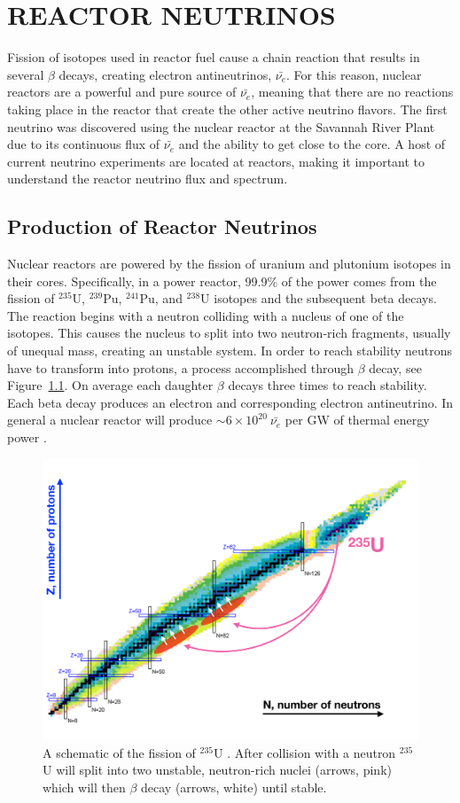 \chapter{\uppercase{Reactor Neutrinos}}

Fission of isotopes used in reactor fuel cause a chain reaction that results in several  $\beta$ decays, creating electron antineutrinos, $\bar{\nu_{e}}$.
For this reason, nuclear reactors are a powerful and pure source of $\bar{\nu_{e}}$, meaning that there are no reactions taking place in the reactor that create the other active neutrino flavors.
The first neutrino was discovered using the nuclear reactor at the Savannah River Plant due to its continuous flux of $\bar{\nu_{e}}$ and the ability to get close to the core.
A host of current neutrino experiments are located at reactors, making it important to understand the reactor neutrino flux and spectrum. 

\section{Production of Reactor Neutrinos}

Nuclear reactors are powered by the fission of uranium and plutonium isotopes in their cores. 
Specifically, in a power reactor, 99.9\% of the power comes from the fission of $^{235}$U, $^{239}$Pu, $^{241}$Pu, and $^{238}$U isotopes and the subsequent beta decays.
The reaction begins with a neutron colliding with a nucleus of one of the isotopes. 
This causes the nucleus to split into two neutron-rich fragments, usually of unequal mass, creating an unstable system.
In order to reach stability neutrons have to transform into protons, a process accomplished through $\beta$ decay, see Figure~\ref{fig:nucchart}.
On average each daughter $\beta$ decays three times to reach stability.
Each beta decay produces an electron and corresponding electron antineutrino. 
In general a nuclear reactor will produce $\sim 6 \times 10^{20}~\bar{\nu_e}$ per GW of thermal energy power \cite{HayesVogel}.

\begin{figure}[h]
	\centering
	\includegraphics[width=0.7\linewidth]{tex/3-reactorneutrinos-images/NuclideChart_U235}
	\caption{A schematic of the fission of $^{235}$U \cite{NucChart}. After collision with a neutron $^{235}$U will split into two unstable, neutron-rich nuclei (arrows, pink) which will then $\beta$ decay (arrows, white) until stable.}
	\label{fig:nucchart}
\end{figure}


